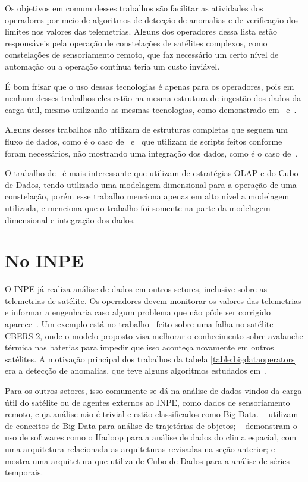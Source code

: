 Os objetivos em comum desses trabalhos são facilitar as atividades dos operadores por meio de algoritmos de detecção de anomalias e de verificação dos limites nos valores das telemetrias. Alguns dos operadores dessa lista estão responsáveis pela operação de constelações de satélites complexos, como constelações de sensoriamento remoto, que faz necessário um certo nível de automação ou a operação contínua teria um custo inviável.

É bom frisar que o uso dessas tecnologias é apenas para os operadores, pois em nenhum desses trabalhos eles estão na mesma estrutura de ingestão dos dados da carga útil, mesmo utilizando as mesmas tecnologias, como demonstrado em~\cite{mateikUsingBigData2017} e~\cite{adamskiDataAnalyticsLarge2016}.

Alguns desses trabalhos não utilizam de estruturas completas que seguem um fluxo de dados, como é o caso de~\cite{fernandezTelemetryAnomalyDetection2017} e~\cite{trollopeAnalysisAutomatedTechniques2018} que utilizam de scripts feitos conforme foram necessários, não mostrando uma integração dos dados, como é o caso de~\cite{yvernesCopernicusGroundSegment2018}.

O trabalho de~\cite{yvernesCopernicusGroundSegment2018} é mais interessante que utilizam de estratégias OLAP e do Cubo de Dados, tendo utilizado uma modelagem dimensional para a operação de uma constelação, porém esse trabalho menciona apenas em alto nível a modelagem utilizada, e menciona que o trabalho foi somente na parte da modelagem dimensional e integração dos dados.

\section{No INPE}

O INPE já realiza análise de dados em outros setores, inclusive sobre as telemetrias de satélite.
Os operadores devem monitorar os valores das telemetrias e informar a engenharia caso algum problema que não pôde ser corrigido aparece~\cite{TominagaFerrAmbr:2017:CoSaTe}.
Um exemplo está no trabalho~\cite{Magalhães:2012:EsAvTé} feito sobre uma falha no satélite CBERS-2, onde o modelo proposto visa melhorar o conhecimento sobre avalanche térmica nas baterias para impedir que isso aconteça novamente em outros satélites.
A motivação principal dos trabalhos da tabela \ref{table:bigdataoperators} era a detecção de anomalias, que teve alguns algoritmos estudados em~\cite{AzevedoAmbrViei::EsSoTé}.

Para os outros setores, isso comumente se dá na análise de dados vindos da carga útil do satélite ou de agentes externos ao INPE, como dados de sensoriamento remoto, cuja análise não é trivial e estão classificados como Big Data.
~\cite{monteiroFRAMEWORKTRAJECTORYDATA2017} utilizam de conceitos de Big Data para análise de trajetórias de objetos; ~\cite{ramosDistributedSystemsPerformance2016} demonstram o uso de softwares como o Hadoop para a análise de dados do clima espacial, com uma arquitetura relacionada as arquiteturas revisadas na seção anterior; e ~\cite{SimõesCamaQuei:2018:DaAnMa} mostra uma arquitetura que utiliza de Cubo de Dados para a análise de séries temporais.


